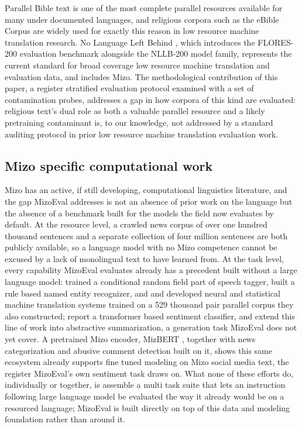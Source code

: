 \documentclass[pdflatex,sn-mathphys-ay]{sn-jnl}
\begin{document}
Parallel Bible text is one of the most complete parallel resources available for many under documented languages, and religious corpora such as the eBible Corpus \citep{akerman2023ebible} are widely used for exactly this reason in low resource machine translation research. No Language Left Behind \citep{nllbteam2022}, which introduces the FLORES-200 evaluation benchmark alongside the NLLB-200 model family, represents the current standard for broad coverage low resource machine translation and evaluation data, and includes Mizo. The methodological contribution of this paper, a register stratified evaluation protocol examined with a set of contamination probes, addresses a gap in how corpora of this kind are evaluated: religious text's dual role as both a valuable parallel resource and a likely pretraining contaminant is, to our knowledge, not addressed by a standard auditing protocol in prior low resource machine translation evaluation work.

\subsection{Mizo specific computational work}
\label{sec:mizo-compute}

Mizo has an active, if still developing, computational linguistics literature, and the gap MizoEval addresses is not an absence of prior work on the language but the absence of a benchmark built for the models the field now evaluates by default. At the resource level, a crawled news corpus of over one hundred thousand sentences \citep{lalrempuii2023lus} and a separate collection of four million sentences \citep{mwirelabs2024corpus} are both publicly available, so a language model with no Mizo competence cannot be excused by a lack of monolingual text to have learned from. At the task level, every capability MizoEval evaluates already has a precedent built without a large language model: \citet{nunsanga2021postagging} trained a conditional random field part of speech tagger, \citet{bentham2016ner} built a rule based named entity recognizer, and \citet{pathak2019mizonmt} and \citet{thangkhanhau2023parallelcorpus} developed neural and statistical machine translation systems trained on a 529 thousand pair parallel corpus they also constructed; \citet{lalthangmawii2025sentiment} report a transformer based sentiment classifier, and \citet{bala2024summarization} extend this line of work into abstractive summarization, a generation task MizoEval does not yet cover. A pretrained Mizo encoder, MizBERT \citep{lalramhluna2024mizbert}, together with news categorization \citep{lalramhluna2023newsclassificationa,lalramhluna2023newsclassificationb} and abusive comment detection \citep{lalrinmawii2025abusive} built on it, shows this same ecosystem already supports fine tuned modeling on Mizo social media text, the register MizoEval's own sentiment task draws on. What none of these efforts do, individually or together, is assemble a multi task suite that lets an instruction following large language model be evaluated the way it already would be on a resourced language; MizoEval is built directly on top of this data and modeling foundation rather than around it.
\end{document}
